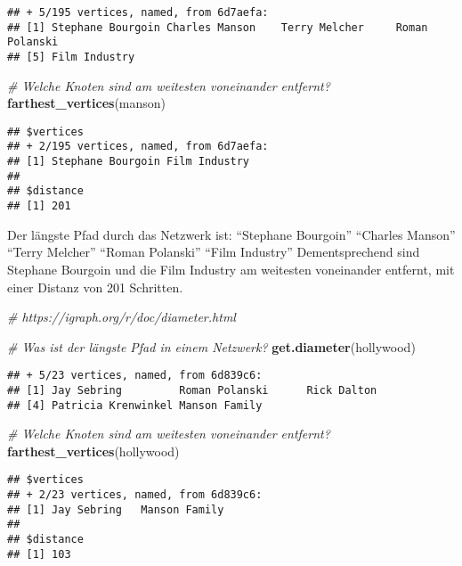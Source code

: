 \documentclass[
]{article}
\newenvironment{Shaded}{\begin{snugshade}}{\end{snugshade}}
\newcommand{\CommentTok}[1]{\textcolor[rgb]{0.56,0.35,0.01}{\textit{#1}}}
\newcommand{\KeywordTok}[1]{\textcolor[rgb]{0.13,0.29,0.53}{\textbf{#1}}}
\newcommand{\NormalTok}[1]{#1}
\begin{document}
\begin{verbatim}
## + 5/195 vertices, named, from 6d7aefa:
## [1] Stephane Bourgoin Charles Manson    Terry Melcher     Roman Polanski   
## [5] Film Industry
\end{verbatim}

\begin{Shaded}
\begin{Highlighting}[]
\CommentTok{# Welche Knoten sind am weitesten voneinander entfernt?}
\KeywordTok{farthest_vertices}\NormalTok{(manson)}
\end{Highlighting}
\end{Shaded}

\begin{verbatim}
## $vertices
## + 2/195 vertices, named, from 6d7aefa:
## [1] Stephane Bourgoin Film Industry    
## 
## $distance
## [1] 201
\end{verbatim}

Der längste Pfad durch das Netzwerk ist: ``Stephane Bourgoin'' ``Charles
Manson'' ``Terry Melcher'' ``Roman Polanski'' ``Film Industry''
Dementsprechend sind Stephane Bourgoin und die Film Industry am
weitesten voneinander entfernt, mit einer Distanz von 201 Schritten.

\begin{Shaded}
\begin{Highlighting}[]
\CommentTok{# https://igraph.org/r/doc/diameter.html}

\CommentTok{# Was ist der längste Pfad in einem Netzwerk?}
\KeywordTok{get.diameter}\NormalTok{(hollywood)}
\end{Highlighting}
\end{Shaded}

\begin{verbatim}
## + 5/23 vertices, named, from 6d839c6:
## [1] Jay Sebring         Roman Polanski      Rick Dalton        
## [4] Patricia Krenwinkel Manson Family
\end{verbatim}

\begin{Shaded}
\begin{Highlighting}[]
\CommentTok{# Welche Knoten sind am weitesten voneinander entfernt?}
\KeywordTok{farthest_vertices}\NormalTok{(hollywood)}
\end{Highlighting}
\end{Shaded}

\begin{verbatim}
## $vertices
## + 2/23 vertices, named, from 6d839c6:
## [1] Jay Sebring   Manson Family
## 
## $distance
## [1] 103
\end{verbatim}
\end{document}

